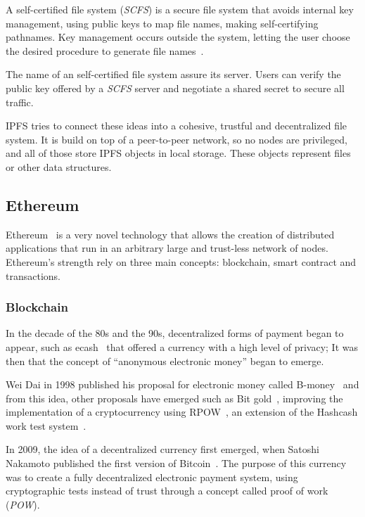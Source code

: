 A self-certified file system (\emph{SCFS}) is a secure file system that avoids
internal key management, using public keys to map file names, making
self-certifying pathnames. Key management occurs outside the system, letting the
user choose the desired procedure to generate file
names~\cite{mazieres2000self}.

The name of an self-certified file system assure its server. Users can verify
the public key offered by a \emph{SCFS} server and negotiate a shared secret to
secure all traffic.

IPFS tries to connect these ideas into a cohesive, trustful and decentralized
file system. It is build on top of a peer-to-peer network, so no nodes are
privileged, and all of those store IPFS objects in local storage. These objects
represent files or other data structures. 

\subsection{Ethereum}
\label{tech:sec:ethereum}
%

Ethereum~\cite{buterin2014ethereum} is a very novel technology that allows the
creation of distributed applications that run in an arbitrary large and
trust-less network of nodes. Ethereum's strength rely on three main concepts:
blockchain, smart contract and transactions.

\subsubsection{Blockchain}
\label{tech:sec:ethereum:bc}
In the decade of the 80s and the 90s, decentralized forms of payment began to
appear, such as ecash~\cite{digicash} that offered a currency with a high level
of privacy; It was then that the concept of ``anonymous electronic money'' began
to emerge.

Wei Dai in 1998 published his proposal for electronic money called
B-money~\cite{bmoney} and from this idea, other proposals have emerged such as
Bit gold~\cite{bitgold}, improving the implementation of a cryptocurrency using
RPOW~\cite{finney2005rpow}, an extension of the Hashcash work test
system~\cite{back2002hashcash}.

In 2009, the idea of a decentralized currency first emerged, when Satoshi
Nakamoto published the first version of Bitcoin~\cite{nakamoto2008bitcoin}. The
purpose of this currency was to create a fully decentralized electronic payment
system, using cryptographic tests instead of trust through a concept called
proof of work (\emph{POW}).

